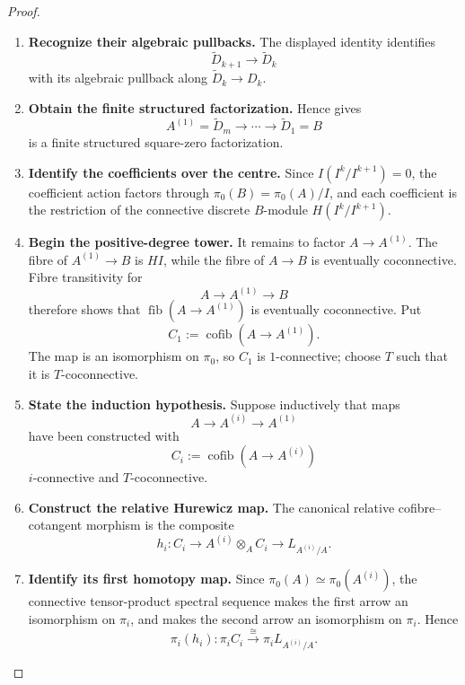 \begin{proof}
\begin{enumerate}[label=\textup{(\arabic*)}]
    \item \textbf{Recognize their algebraic pullbacks.}
    The displayed identity
    identifies
    \[
        \widetilde D_{k+1}\longrightarrow\widetilde D_k
    \]
    with its algebraic pullback along
    \(\widetilde D_k\to D_k\).
    \item \textbf{Obtain the finite structured factorization.}
    Hence
     gives
    \[
        A^{(1)}=\widetilde D_m
        \longrightarrow\cdots\longrightarrow
        \widetilde D_1=B
    \]
    is a finite structured square-zero factorization.
    \item \textbf{Identify the coefficients over the centre.}
    Since
    \(I(I^k/I^{k+1})=0\), the coefficient action factors through
    \(\pi_0(B)=\pi_0(A)/I\), and each coefficient is the restriction of the
    connective discrete \(B\)-module \(H(I^k/I^{k+1})\).
    \item \textbf{Begin the positive-degree tower.}
    It remains to factor \(A\to A^{(1)}\). The fibre of
    \(A^{(1)}\to B\) is \(HI\), while the fibre of \(A\to B\) is eventually
    coconnective. Fibre transitivity for
    \[
        A\longrightarrow A^{(1)}\longrightarrow B
    \]
    therefore shows that \(\operatorname{fib}(A\to A^{(1)})\) is eventually
    coconnective. Put
    \[
        C_1:=\operatorname{cofib}(A\to A^{(1)}).
    \]
    The map is an isomorphism on \(\pi_0\), so \(C_1\) is \(1\)-connective; choose
    \(T\) such that it is \(T\)-coconnective.
    \item \textbf{State the induction hypothesis.}
    Suppose inductively that maps
    \[
        A\longrightarrow A^{(i)}\longrightarrow A^{(1)}
    \]
    have been constructed with
    \[
        C_i:=\operatorname{cofib}(A\to A^{(i)})
    \]
    \(i\)-connective and \(T\)-coconnective.
    \item \textbf{Construct the relative Hurewicz map.}
    The canonical relative
    cofibre--cotangent morphism is the composite
    \[
        h_i:
        C_i
        \longrightarrow
        A^{(i)}\otimes_AC_i
        \longrightarrow
        L_{A^{(i)}/A}.
    \]
    \item \textbf{Identify its first homotopy map.}
    Since \(\pi_0(A)\simeq\pi_0(A^{(i)})\), the connective tensor-product spectral
    sequence makes the first arrow an isomorphism on \(\pi_i\), and
     makes the second arrow an
    isomorphism on \(\pi_i\). Hence
    \[
        \pi_i(h_i):\pi_iC_i\xrightarrow{\cong}\pi_iL_{A^{(i)}/A}.
\]
\end{enumerate}
\end{proof}
